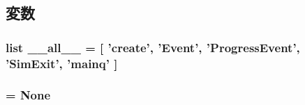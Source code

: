\subsection{変数}
\hypertarget{namespacem5_1_1event_aa4a022e6ddacd362b83964da5cc5d044}{
\subsubsection[{\_\-\_\-all\_\-\_\-}]{\setlength{\rightskip}{0pt plus 5cm}list {\bf \_\-\_\-all\_\-\_\-} = \mbox{[} 'create', '{\bf Event}', '{\bf ProgressEvent}', 'SimExit', '{\bf mainq}' \mbox{]}}}
\label{namespacem5_1_1event_aa4a022e6ddacd362b83964da5cc5d044}
\hypertarget{namespacem5_1_1event_a65ae9c1bd73171d1b523afb05e66d7e0}{
\subsubsection[{mainq}]{ = None}}
\label{namespacem5_1_1event_a65ae9c1bd73171d1b523afb05e66d7e0}
